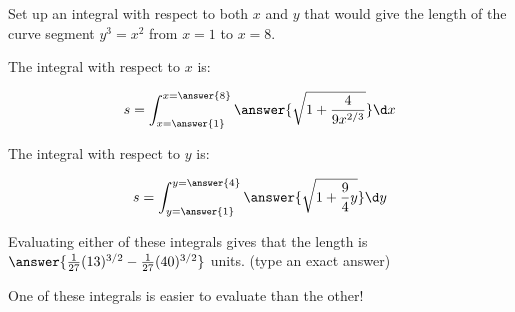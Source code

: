 \documentclass{ximera}
\author{Jim Talamo}
\begin{document}
\begin{exercise}

Set up an integral with respect to both $x$ and $y$ that would give the length of the curve segment $y^3=x^2$ from $x=1$ to $x=8$.

The integral with respect to $x$ is:

\[
s= \int_{x=\answer{1}}^{x=\answer{8}} \answer{\sqrt{1+\frac{4}{9x^{2/3}}}} \d x
\]

The integral with respect to $y$ is:

\[
s= \int_{y=\answer{1}}^{y=\answer{4}} \answer{\sqrt{1+\frac{9}{4}y}} \d y
\]

Evaluating either of these integrals gives that the length is $\answer{\frac{1}{27} (13)^{3/2} - \frac{1}{27} (40)^{3/2}}$ units. (type an exact answer)

\begin{remark}
One of these integrals is easier to evaluate than the other!
\end{remark}
\end{exercise}
\end{document}
